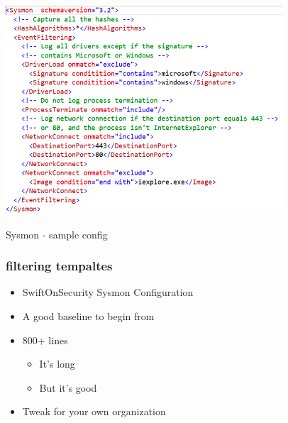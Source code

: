 \begin{table}[h]
  \centering
  \includegraphics[width=\textwidth]{resources/12-sysmon-sample-config.png}
  \caption{Sysmon - sample config}
\end{table}

\subsubsection*{filtering tempaltes}

\begin{itemize}
  \item SwiftOnSecurity Sysmon Configuration
  \item A good baseline to begin from
  \item 800+ lines
  \begin{itemize}
    \item It's long
    \item But it's good
  \end{itemize}
  \item Tweak for your own organization
\end{itemize}

